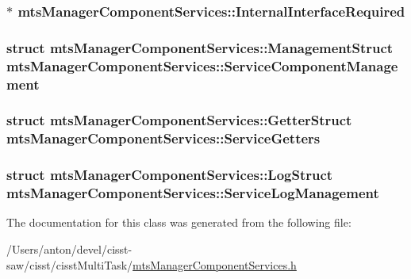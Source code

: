 \subsubsection[{Internal\+Interface\+Required}]{$\ast$ mts\+Manager\+Component\+Services\+::\+Internal\+Interface\+Required\hspace{0.3cm}{\ttfamily [protected]}}\label{classmts_manager_component_services_a56e054d1c774cec82eaa0ae12406b02d}
\hypertarget{classmts_manager_component_services_afa9127a7692a729340f2eb537e3d1f43}{}
\subsubsection[{Service\+Component\+Management}]{\setlength{\rightskip}{0pt plus 5cm}struct {\bf mts\+Manager\+Component\+Services\+::\+Management\+Struct}  mts\+Manager\+Component\+Services\+::\+Service\+Component\+Management\hspace{0.3cm}{\ttfamily [protected]}}\label{classmts_manager_component_services_afa9127a7692a729340f2eb537e3d1f43}
\hypertarget{classmts_manager_component_services_aa2830971a51549f362b28011511b177f}{}
\subsubsection[{Service\+Getters}]{\setlength{\rightskip}{0pt plus 5cm}struct {\bf mts\+Manager\+Component\+Services\+::\+Getter\+Struct}  mts\+Manager\+Component\+Services\+::\+Service\+Getters\hspace{0.3cm}{\ttfamily [protected]}}\label{classmts_manager_component_services_aa2830971a51549f362b28011511b177f}
\hypertarget{classmts_manager_component_services_a521a825f8142d5b44abf696abab1f8ef}{}
\subsubsection[{Service\+Log\+Management}]{\setlength{\rightskip}{0pt plus 5cm}struct {\bf mts\+Manager\+Component\+Services\+::\+Log\+Struct}  mts\+Manager\+Component\+Services\+::\+Service\+Log\+Management\hspace{0.3cm}{\ttfamily [protected]}}\label{classmts_manager_component_services_a521a825f8142d5b44abf696abab1f8ef}


The documentation for this class was generated from the following file\+:\begin{DoxyCompactItemize}
\item 
/\+Users/anton/devel/cisst-\/saw/cisst/cisst\+Multi\+Task/\hyperlink{mts_manager_component_services_8h}{mts\+Manager\+Component\+Services.\+h}\end{DoxyCompactItemize}
